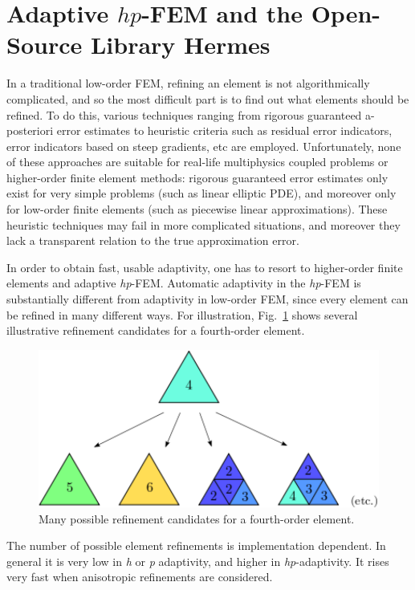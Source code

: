 \section{Adaptive $hp$-FEM and the Open-Source Library Hermes}
\label{sec:hermes}

In a traditional low-order FEM, refining an element is not algorithmically complicated,
and so the most difficult part is to find out what elements should be refined. 
To do this, various techniques ranging from rigorous guaranteed a-posteriori 
error estimates to heuristic criteria such as residual error indicators, 
error indicators based on steep gradients, etc are employed. 
Unfortunately, none of these approaches are suitable for real-life 
multiphysics coupled problems or higher-order finite element methods: 
rigorous guaranteed error estimates only exist for very simple problems 
(such as linear elliptic PDE), and moreover only for low-order finite elements 
(such as piecewise linear approximations). These heuristic techniques 
may fail in more complicated situations, and moreover they lack a 
transparent relation to the true approximation error.

In order to obtain fast, usable adaptivity, one has to resort to higher-order finite 
elements and adaptive \emph{hp}-FEM.
Automatic adaptivity in the \emph{hp}-FEM is substantially different from adaptivity 
in low-order FEM, since every element can be refined in many different ways. 
For illustration, Fig.~\ref{fig:refinements} shows several illustrative 
refinement candidates for a fourth-order element.
\begin{figure}[!ht]
  \begin{centering}
  \includegraphics[width=0.5\columnwidth]{refinements}
  \caption{\label{fig:refinements} Many possible refinement candidates for a fourth-order
  element.}
  \end{centering}
\vspace{-0.5cm}
\end{figure}

\newpage
The number of possible element refinements is implementation dependent. 
In general it is very low in \emph{h} or \emph{p} adaptivity, 
and higher in \emph{hp}-adaptivity. It rises very fast when 
anisotropic refinements are considered.

